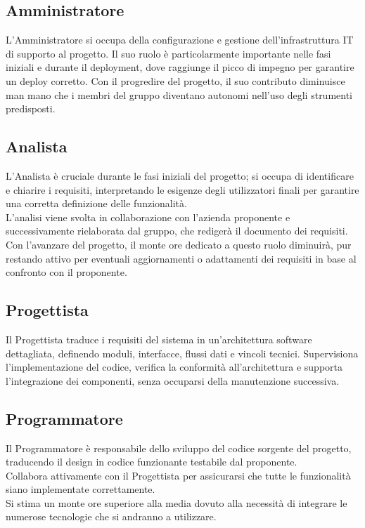 \documentclass{article}
\begin{document}
	\subsection{Amministratore}
	L'Amministratore si occupa della configurazione e gestione dell'infrastruttura IT di supporto al progetto.
	Il suo ruolo è particolarmente importante nelle fasi iniziali e durante il deployment, dove raggiunge il picco di impegno per garantire un deploy corretto.
	Con il progredire del progetto, il suo contributo diminuisce man mano che i membri del gruppo diventano autonomi nell'uso degli strumenti predisposti.
	
	\subsection{Analista}
	L'Analista è cruciale durante le fasi iniziali del progetto; si occupa di identificare e chiarire i requisiti, interpretando le esigenze degli utilizzatori finali per garantire una corretta definizione delle funzionalità.\\
	L'analisi viene svolta in collaborazione con l'azienda proponente e successivamente rielaborata dal gruppo, che redigerà il documento dei requisiti.\\
	Con l’avanzare del progetto, il monte ore dedicato a questo ruolo diminuirà, pur restando attivo per eventuali aggiornamenti o adattamenti dei requisiti in base al confronto con il proponente.
	
	\subsection{Progettista}
	Il Progettista traduce i requisiti del sistema in un'architettura software dettagliata, definendo moduli, interfacce, flussi dati e vincoli tecnici. Supervisiona l'implementazione del codice, verifica la conformità all'architettura e supporta l'integrazione dei componenti, senza occuparsi della manutenzione successiva.
	
	\subsection{Programmatore}
	Il Programmatore è responsabile dello sviluppo del codice sorgente del progetto, traducendo il design in codice funzionante testabile dal proponente.\\
	Collabora attivamente con il Progettista per assicurarsi che tutte le funzionalità siano implementate correttamente.\\
	Si stima un monte ore superiore alla media dovuto alla necessità di integrare le numerose tecnologie che si andranno a utilizzare.
	
\end{document}
